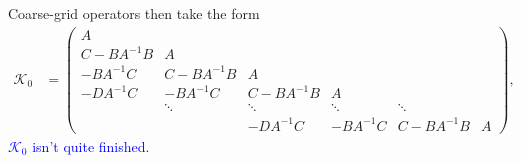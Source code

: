 \documentclass[a4paper,12pt]{article}
\newcommand{\tcb}{\textcolor{blue}}
\begin{document}
Coarse-grid operators then take the form
%
\begin{align*}
\mathcal{K}_0 & =
\begin{pmatrix}
	A \\
	C - BA^{-1}B& A \\ 
	-BA^{-1}C & C- BA^{-1}B & A \\
	- DA^{-1}C & - BA^{-1}C & C - BA^{-1}B & A \\
	& \ddots & \ddots & \ddots & \ddots \\
	& & - DA^{-1}C & -BA^{-1}C & C - BA^{-1}B & A
\end{pmatrix},
\end{align*}
%
\tcb{$\mathcal{K}_0$ isn't quite finished.}
\end{document}

